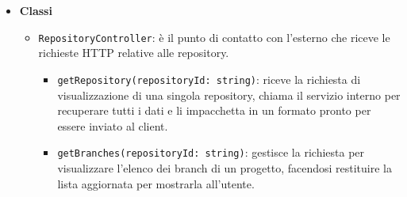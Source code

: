 \documentclass[a4paper, 11pt]{article}
\begin{document}
\begin{itemize}
\begin{itemize}
      \item \texttt{IGitHubAccessRepository}: definisce il contratto per la verifica dei permessi d'accesso su GitHub.
        \begin{itemize}
          \item \texttt{verifyAccess(ownerName: string, name: string, accessToken: string): void} 
        \end{itemize}

      \item \texttt{IRepositoryReader}: definisce il contratto per la lettura aggregata di repository.
        \begin{itemize}
          \item \texttt{getRepositories(repositoryIds: string[], searchInput: string): \\ RepositoryInfo[]} 
        \end{itemize}

      \item \texttt{IRepositoryWriter}: definisce il contratto per la creazione e l'aggiornamento tecnico delle repository.
        \begin{itemize}
          \item \texttt{addRepository(repositoryUrl: string, accessToken: string): string} 

          \item \texttt{updateToken(repositoryId: string, accessToken: string): void} 
        \end{itemize}
    \end{itemize}

  \item \textbf{Classi}
    \begin{itemize}
      \item \texttt{RepositoryController}: è il punto di contatto con l'esterno che riceve le richieste HTTP relative alle repository.
        \begin{itemize}
          \item \texttt{getRepository(repositoryId: string)}: riceve la richiesta di visualizzazione di una singola repository, chiama il servizio interno per recuperare tutti i dati e li impacchetta in un formato pronto per essere inviato al client.
          
          \item \texttt{getBranches(repositoryId: string)}: gestisce la richiesta per visualizzare l'elenco dei branch di un progetto, facendosi restituire la lista aggiornata per mostrarla all'utente.
        \end{itemize}


\end{itemize}
\end{itemize}
\end{document}
